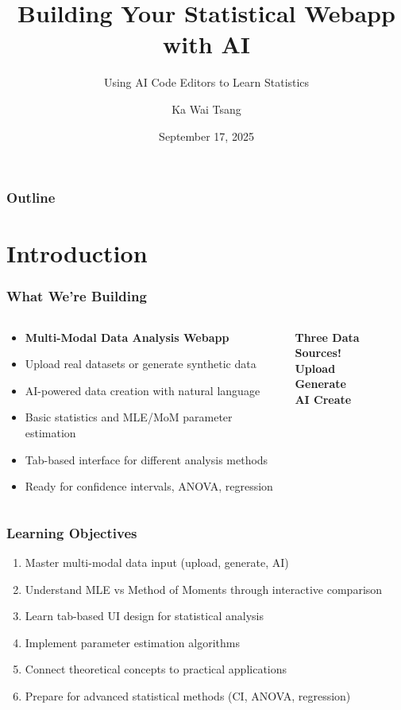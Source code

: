 \documentclass[aspectratio=169]{beamer}
\title[Statistical Webapp]{Building Your Statistical Webapp with AI}
\subtitle{Using AI Code Editors to Learn Statistics}
\author{Ka Wai Tsang}
\institute[CUHK(SZ)]{School of Data Science, CUHK(SZ)}
\date{September 17, 2025}
\begin{document}
\begin{frame}
\titlepage
\end{frame}

\begin{frame}
\frametitle{Outline}
\tableofcontents
\end{frame}

\section{Introduction}

\begin{frame}
\frametitle{What We're Building}
\begin{columns}
\begin{column}{0.6\textwidth}
\begin{itemize}
\item \textbf{Multi-Modal Data Analysis Webapp}
\item Upload real datasets or generate synthetic data
\item AI-powered data creation with natural language
\item Basic statistics and MLE/MoM parameter estimation
\item Tab-based interface for different analysis methods
\item Ready for confidence intervals, ANOVA, regression
\end{itemize}
\end{column}
\begin{column}{0.4\textwidth}
\begin{center}
\textbf{Three Data Sources!} \\
\vspace{1em}
\textbf{Upload} \\
\textbf{Generate} \\
\textbf{AI Create}
\end{center}
\end{column}
\end{columns}
\end{frame}

\begin{frame}
\frametitle{Learning Objectives}
\begin{enumerate}
\item Master multi-modal data input (upload, generate, AI)
\item Understand MLE vs Method of Moments through interactive comparison
\item Learn tab-based UI design for statistical analysis
\item Implement parameter estimation algorithms
\item Connect theoretical concepts to practical applications
\item Prepare for advanced statistical methods (CI, ANOVA, regression)
\end{enumerate}
\end{frame}
\end{document}
